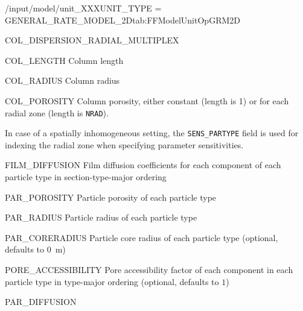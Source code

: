 \begin{condsubgroup}{/input/model/unit\_XXX}{UNIT\_TYPE = GENERAL\_RATE\_MODEL\_2D}{tab:FFModelUnitOpGRM2D}
\begin{dataset}[unit=--,type=int,range={$\{0, \dots, 7 \}$},length={1}]{COL\_DISPERSION\_RADIAL\_MULTIPLEX}
  \end{dataset}
  \begin{dataset}[unit=\si{\metre},type=double,range={$> 0$},length={1}]{COL\_LENGTH}
    Column length
  \end{dataset}
  \begin{dataset}[unit=\si{\metre},type=double,range={$> 0$},length={1}]{COL\_RADIUS}
    Column radius
  \end{dataset}
  \begin{dataset}[unit=--,type=double,range={$(0,1]$},length={1 / \texttt{NRAD}}]{COL\_POROSITY}
    Column porosity, either constant (length is 1) or for each radial zone (length is \texttt{NRAD}).

    In case of a spatially inhomogeneous setting, the \texttt{SENS\_PARTYPE} field is used for indexing the radial zone when specifying parameter sensitivities.
  \end{dataset}
  \begin{dataset}[unit=\si{\metre\per\second},type=double,range={$\geq 0$},length={$\texttt{NPARTYPE} \cdot \texttt{NCOMP}$ / $\texttt{NPARTYPE} \cdot \texttt{NCOMP} \cdot \texttt{NSEC}$}]{FILM\_DIFFUSION}
    Film diffusion coefficients for each component of each particle type in section-type-major ordering
  \end{dataset}
  \begin{dataset}[unit=--,type=double,range={$(0,1]$},length={\texttt{NPARTYPE}}]{PAR\_POROSITY}
    Particle porosity of each particle type
  \end{dataset}
  \begin{dataset}[unit=\si{\metre},type=double,range={$>0$},length={\texttt{NPARTYPE}}]{PAR\_RADIUS}
    Particle radius of each particle type
  \end{dataset}
  \begin{dataset}[unit=\si{\metre},type=double,range={$[0, \texttt{PAR\_RADIUS})$},length={\texttt{NPARTYPE}}]{PAR\_CORERADIUS}
    Particle core radius of each particle type (optional, defaults to \SI{0}{\metre})
  \end{dataset}
  \begin{dataset}[unit=--,type=double,range={$(0, 1]$},length={$\texttt{NPARTYPE} \cdot \texttt{NCOMP}$}]{PORE\_ACCESSIBILITY}
    Pore accessibility factor of each component in each particle type in type-major ordering (optional, defaults to $1$)
  \end{dataset}
  \begin{dataset}[unit=\si{\square\metre\of{MP}\per\second},type=double,range={$\geq 0$},length={$\texttt{NPARTYPE} \cdot \texttt{NCOMP}$ / $\texttt{NSEC} \cdot \texttt{NPARTYPE} \cdot \texttt{NCOMP}$}]{PAR\_DIFFUSION}

\end{dataset}
\end{condsubgroup}
